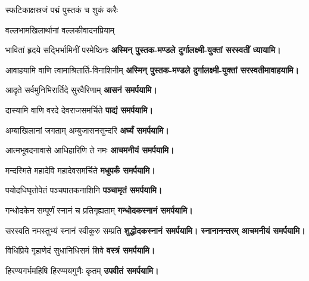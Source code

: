 \begin{center}

{स्फटिकाक्षस्रजं पद्मं पुस्तकं च शुकं करैः}

{वल्लभामखिलार्थानां वल्लकीवादनप्रियाम्}

{भावितां हृदये सद्भिर्भामिनीं परमेष्ठिनः}
\textbf{अस्मिन् पुस्तक-मण्डले दुर्गालक्ष्मी-युक्तां सरस्वतीं ध्यायामि।}
\medskip

{आवाहयामि वाणि त्वामाश्रितार्ति-विनाशिनीम्}
\textbf{अस्मिन् पुस्तक-मण्डले दुर्गालक्ष्मी-युक्तां सरस्वतीमावाहयामि।}
\medskip

{आदृते सर्वमुनिभिरार्तिदे सुरवैरिणाम् }
\textbf{\devAya{} आसनं समर्पयामि।}
\medskip

{दास्यामि वाणि वरदे देवराजसमर्चिते}
\textbf{\devAya{} पाद्यं समर्पयामि।}
\medskip

{अम्बाखिलानां जगताम् अम्बुजासनसुन्दरि}
\textbf{\devAya{} अर्घ्यं समर्पयामि।}
\medskip

{आत्मभूवदनावासे आधिहारिणि ते नमः}
\textbf{\devAya{} आचमनीयं समर्पयामि।}
\medskip

{मन्दस्मिते महादेवि महादेवसमर्चिते}
\textbf{\devAya{} मधुपर्कं समर्पयामि।}
\medskip

{पयोदधिघृतोपेतं पञ्चपातकनाशिनि}
\textbf{\devAya{} पञ्चामृतं समर्पयामि।}
\medskip

{गन्धोदकेन सम्पूर्णं स्नानं च प्रतिगृह्यताम्}
\textbf{\devAya{} गन्धोदकस्नानं समर्पयामि।}\footnotemark[\value{footnote}]
\medskip

{सरस्वति नमस्तुभ्यं स्नानं स्वीकुरु सम्प्रति}
\textbf{\devAya{} शुद्धोदकस्नानं समर्पयामि। स्नानानन्तरम् आचमनीयं समर्पयामि।}
\medskip

{विधिप्रिये गृहाणेदं सुधानिधिसमं शिवे}
\textbf{\devAya{} वस्त्रं समर्पयामि।}
\medskip

{हिरण्यगर्भमहिषि हिरण्मयगुणैः कृतम्}
\textbf{\devAya{} उपवीतं समर्पयामि।}
\medskip


\end{center}
